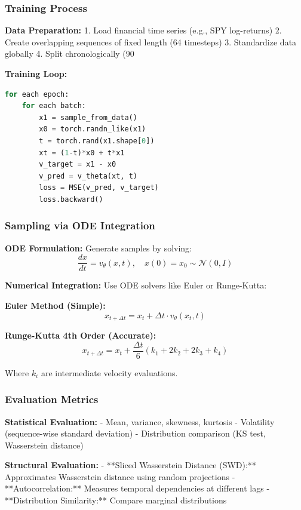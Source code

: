\documentclass[a4paper,12pt]{article}
\begin{document}
\subsubsection{Training Process}

\textbf{Data Preparation:}
1. Load financial time series (e.g., SPY log-returns)
2. Create overlapping sequences of fixed length (64 timesteps)
3. Standardize data globally
4. Split chronologically (90%

\textbf{Training Loop:}
\begin{lstlisting}[language=Python, caption=Flow Matching Training]
for each epoch:
    for each batch:
        x1 = sample_from_data()
        x0 = torch.randn_like(x1)
        t = torch.rand(x1.shape[0])
        xt = (1-t)*x0 + t*x1
        v_target = x1 - x0
        v_pred = v_theta(xt, t)
        loss = MSE(v_pred, v_target)
        loss.backward()
\end{lstlisting}

\subsubsection{Sampling via ODE Integration}

\textbf{ODE Formulation:} Generate samples by solving:
\[ \frac{dx}{dt} = v_\theta(x, t), \quad x(0) = x_0 \sim \mathcal{N}(0, I) \]

\textbf{Numerical Integration:} Use ODE solvers like Euler or Runge-Kutta:

\textbf{Euler Method (Simple):}
\[ x_{t+\Delta t} = x_t + \Delta t \cdot v_\theta(x_t, t) \]

\textbf{Runge-Kutta 4th Order (Accurate):}
\[ x_{t+\Delta t} = x_t + \frac{\Delta t}{6} (k_1 + 2k_2 + 2k_3 + k_4) \]

Where $k_i$ are intermediate velocity evaluations.

\subsubsection{Evaluation Metrics}

\textbf{Statistical Evaluation:}
- Mean, variance, skewness, kurtosis
- Volatility (sequence-wise standard deviation)
- Distribution comparison (KS test, Wasserstein distance)

\textbf{Structural Evaluation:}
- **Sliced Wasserstein Distance (SWD):** Approximates Wasserstein distance using random projections
- **Autocorrelation:** Measures temporal dependencies at different lags
- **Distribution Similarity:** Compare marginal distributions
\end{document}
